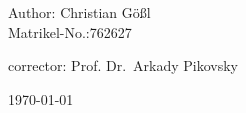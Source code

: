 \begin{titlepage}
\begin{center}
\begin{minipage}{0.45\textwidth}
\begin{flushleft} \normalsize 
Author: Christian Gößl\\
Matrikel-No.:762627

\end{flushleft}
\end{minipage}
\hfill
\begin{minipage}{0.45\textwidth}
\begin{flushright} \normalsize 
\begin{flushleft}
corrector: Prof. Dr.~Arkady Pikovsky\\
\end{flushleft}
\end{flushright}
\end{minipage}

\vfill
{\normalsize  \today}
\vspace*{4.5cm}


\end{center}

\end{titlepage}